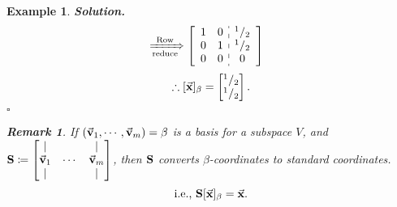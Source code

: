 \documentclass[12pt, a4paper]{article}
\newtheorem{eg}{Example}[subsection]
\newtheorem*{rmk}{\indent Remark}
\newenvironment*{sol}{\par\indent\textbf{\textit{Solution. }}}{\hfill{$\square$}\par}
\def\vecx{\va{x}}
\def\vecv{\va{v}}
\def\matrixS{\vb{S}}
\begin{document}
\begin{eg}
\begin{sol}
$$\begin{aligned}
			&\xRightarrow[\text{reduce}]{\text{Row}}\left[\begin{array}{c:c}\begin{matrix}1&0\\0&1\\0&0\end{matrix}&\begin{matrix}^1/_2\\^1/_2\\0\end{matrix}\end{array}\right]
		\end{aligned}$$
		\[\therefore[\vecx]_\beta=\begin{bmatrix}^1/_2\\^1/_2\\\end{bmatrix}.\]
	\end{sol}
	\begin{rmk} If $(\vecv_1,\cdots,\vecv_m)=\beta$ is a basis for a subspace $V$, and $\matrixS\coloneqq\begin{bmatrix}|&&|\\\vecv_1&\cdots&\vecv_m\\|&&|\end{bmatrix}$, then $\matrixS$ converts $\beta$-coordinates to standard coordinates. \[\text{i.e., }\matrixS[\vecx]_\beta=\vecx.\]
	\end{rmk}
\end{eg}
\end{document}
